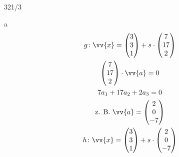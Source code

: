 \begin{exercise}{321/3}
  \item [a]
  \begin{gather*}
    g \colon \vv{x} = \begin{pmatrix}3 \\ 3 \\ 1\end{pmatrix} + s \cdot \begin{pmatrix}7 \\ 17 \\ 2\end{pmatrix} \\
    \begin{pmatrix}7 \\ 17 \\ 2\end{pmatrix} \cdot \vv{a} = 0 \\
    7a_1 + 17a_2 + 2a_3 = 0 \\
    \text{z. B. } \vv{a} = \begin{pmatrix}2 \\ 0 \\ -7\end{pmatrix} \\
    h \colon \vv{x} = \begin{pmatrix}3 \\ 3 \\ 1\end{pmatrix} + s \cdot \begin{pmatrix}2 \\ 0 \\ -7\end{pmatrix}
  \end{gather*}
\end{exercise}
